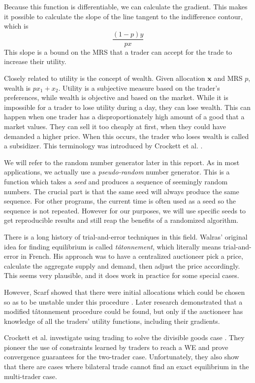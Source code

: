 \documentclass[12pt,a4paper,titlepage]{article}
\begin{document}
Because this function is differentiable, we can calculate the gradient.
This makes it possible to calculate the slope of the line tangent to the indifference contour, which is
\[
  \frac{(1-p)y}{px}
\]
This slope is a bound on the MRS that a trader can accept for the trade to increase their utility.

Closely related to utility is the concept of wealth.
Given allocation $\mathbf{x}$ and MRS $p$, wealth is $ px_1 + x_2 $.
Utility is a subjective measure based on the trader's preferences, while wealth is objective and based on the market.
While it is impossible for a trader to lose utility during a day, they can lose wealth.
This can happen when one trader has a disproportionately high amount of a good that a market values.
They can sell it too cheaply at first, when they could have demanded a higher price.
When this occurs, the trader who loses wealth is called a subsidizer.
This terminology was introduced by Crockett et al. \cite{crockett}.

We will refer to the random number generator later in this report.
As in most applications, we actually use a \textit{pseudo-random} number generator.
This is a function which takes a \textit{seed} and produces a sequence of seemingly random numbers.
The crucial part is that the same seed will always produce the same sequence.
For other programs, the current time is often used as a seed so the sequence is not repeated.
However for our purposes, we will use specific seeds to get reproducible results and still reap the benefits of a randomized algorithm.

There is a long history of trial-and-error techniques in this field.
Walras' original idea for finding equilibrium is called \textit{tâtonnement}, which literally means trial-and-error in French.
His approach was to have a centralized auctioneer pick a price, calculate the aggregate supply and demand, then adjust the price accordingly.
This seems very plausible, and it does work in practice for some special cases.

However, Scarf showed that there were initial allocations which could be chosen so as to be unstable under this procedure \cite{scarf}.
Later research demonstrated that a modified tâtonnement procedure could be found, but only if the auctioneer has knowledge of all the traders' utility functions, including their gradients.

Crockett et al. investigate using trading to solve the divisible goods case \cite{crockett}.
They pioneer the use of constraints learned by traders to reach a WE and prove convergence guarantees for the two-trader case.
Unfortunately, they also show that there are cases where bilateral trade cannot find an exact equilibrium in the multi-trader case.
\end{document}
